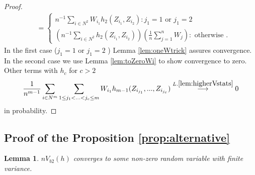 \documentclass{article} %
\newtheorem{lemma}{Lemma}
\begin{document}
\begin{proof}
\begin{align}
&= \left\{
 \begin{array}{lr}
    n^{-1} \sum_{i \in N^{2}}  W_{i_1}  h_2(Z_{i_1},Z_{i_2}) : j_1=1 \text{ or } j_1=2 \\
    \left( n^{-1} \sum_{i \in N^{2}}   h_2(Z_{i_1},Z_{i_2}) \right) \left( \frac 1 n \sum_{j=1}^n W_j \right) : \text{ otherwise }. 
  \end{array}
\right.
\end{align}
In the first case ($j_1=1$  or $j_1=2$ ) Lemma \ref{lem:oneWtrick} assures convergence. In the second case we use Lemma \ref{lem:toZeroWi} to show convergence to zero. 
Other terms with $h_c$ for $c>2$
\begin{align}
\frac{1} {n^{m-1}}  \sum_{i \in N^m} \sum_{1 \leq j_1 < ...<j_{c} \leq m } W_{i_1}  h_{m-1}(Z_{i_{j_1}},...,Z_{i_{j_{c}}}) \overset{L. \ref{lem:higherVstats}}{\longrightarrow} 0 
\end{align}
in probability.
\end{proof}


\subsection{Proof of the Proposition \ref{prop:alternative}}
\label{sec:prMainTwo}



\begin{lemma}
\label{lem:degb1}
$nV_{b2}(h)$ converges to some non-zero random variable with finite variance.
\end{lemma}
\end{document}
